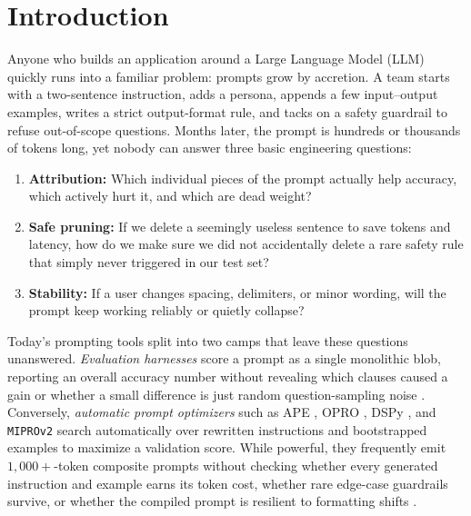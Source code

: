 \documentclass[11pt,a4paper]{article}
\begin{document}
\section{Introduction}
Anyone who builds an application around a Large Language Model (LLM) quickly runs into a familiar problem: prompts grow by accretion. A team starts with a two-sentence instruction, adds a persona, appends a few input--output examples, writes a strict output-format rule, and tacks on a safety guardrail to refuse out-of-scope questions. Months later, the prompt is hundreds or thousands of tokens long, yet nobody can answer three basic engineering questions:
\begin{enumerate}[leftmargin=*,nosep]
    \item \textbf{Attribution:} Which individual pieces of the prompt actually help accuracy, which actively hurt it, and which are dead weight?
    \item \textbf{Safe pruning:} If we delete a seemingly useless sentence to save tokens and latency, how do we make sure we did not accidentally delete a rare safety rule that simply never triggered in our test set?
    \item \textbf{Stability:} If a user changes spacing, delimiters, or minor wording, will the prompt keep working reliably or quietly collapse?
\end{enumerate}

Today's prompting tools split into two camps that leave these questions unanswered. \emph{Evaluation harnesses} score a prompt as a single monolithic blob, reporting an overall accuracy number without revealing which clauses caused a gain or whether a small difference is just random question-sampling noise \citep{miller2024adding,mizrahi2024state}. Conversely, \emph{automatic prompt optimizers} such as APE \citep{zhou2023large}, OPRO \citep{yang2023large}, DSPy \citep{khattab2024dspy}, and \texttt{MIPROv2} \citep{opsahl2024optimizing} search automatically over rewritten instructions and bootstrapped examples to maximize a validation score. While powerful, they frequently emit $1{,}000+$-token composite prompts without checking whether every generated instruction and example earns its token cost, whether rare edge-case guardrails survive, or whether the compiled prompt is resilient to formatting shifts \citep{sclar2024quantifying,habba2025dove}.
\end{document}
